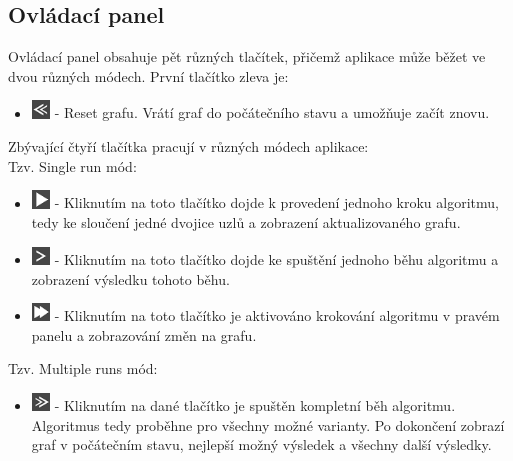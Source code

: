 \documentclass[../projekt.tex]{subfiles}
\begin{document}
\subsection{Ovládací panel}

Ovládací panel obsahuje pět různých tlačítek, přičemž aplikace může běžet ve dvou různých módech. První tlačítko zleva je:  

\begin{itemize}
    \item \includegraphics[height=1.3em]{obrazky-figures/resetSmall.png} - Reset grafu. Vrátí graf do počátečního stavu a umožňuje začít znovu. 
\end{itemize}

\newpage

\noindent Zbývající čtyří tlačítka pracují v různých módech aplikace: \\

\noindent Tzv. Single run mód:

\begin{itemize}
    \item \includegraphics[height=1.3em]{obrazky-figures/playSmall.png} - Kliknutím na toto tlačítko dojde k provedení jednoho kroku algoritmu, tedy ke sloučení jedné dvojice uzlů a zobrazení aktualizovaného grafu.
    \item \includegraphics[height=1.3em]{obrazky-figures/nextStepSmall.png} - Kliknutím na toto tlačítko dojde ke spuštění jednoho běhu algoritmu a zobrazení výsledku tohoto běhu.
    \item \includegraphics[height=1.3em]{obrazky-figures/manualSteps.png} - Kliknutím na toto tlačítko je aktivováno krokování algoritmu v pravém panelu a zobrazování změn na grafu. 
\end{itemize}

\noindent Tzv. Multiple runs mód:

\begin{itemize}
	\item \includegraphics[height=1.3em]{obrazky-figures/finishSmall.png} - Kliknutím na dané tlačítko je spuštěn kompletní běh algoritmu. Algoritmus tedy proběhne pro všechny možné varianty. Po dokončení zobrazí graf v počátečním stavu, nejlepší možný výsledek a všechny další výsledky.
\end{itemize}
\end{document}
